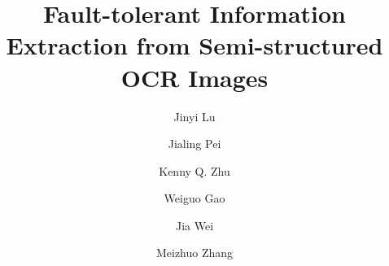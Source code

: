\documentclass[preprint,11pt]{elsarticle}
\begin{document}
\begin{frontmatter}

\title{Fault-tolerant Information Extraction from Semi-structured OCR Images
}

\author{Jinyi Lu}
\author{Jialing Pei}
\author{Kenny Q. Zhu}
\author{Weiguo Gao}
\author{Jia Wei}
\author{Meizhuo Zhang}
\address{
Department of Computer Science \& Engineering, Shanghai Jiao Tong University,
800 Dongchuan Road, Shanghai 200240, China}



\end{frontmatter}
\end{document}
